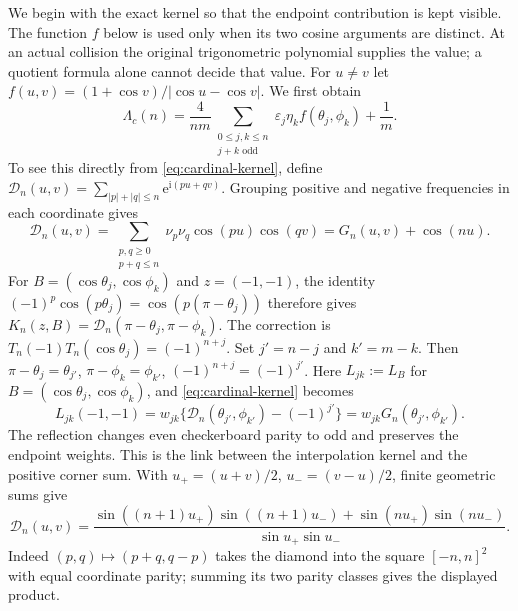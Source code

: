 We begin with the exact kernel so that the endpoint contribution is
kept visible. The function $f$ below is used only when its two cosine
arguments are distinct. At an actual collision the original
trigonometric polynomial supplies the value; a quotient formula alone
cannot decide that value.
For $u\ne v$ let $f(u,v)=(1+\cos v)/|\cos u-\cos v|$. We first obtain
\begin{equation}\label{cu:positive}
 \Lambda_c(n)=\frac4{nm}
 \sum_{\substack{0\leq j,k\leq n\\j+k\text{ odd}}}
       \varepsilon_j\eta_k f(\theta_j,\phi_k)+\frac1m.
\end{equation}
To see this directly from \eqref{eq:cardinal-kernel}, define
$\mathcal{D}_n(u,v)=\sum_{|p|+|q|\leq n}\mathrm e^{\mathrm i(pu+qv)}$. Grouping positive and negative frequencies in each coordinate gives
\[
 \mathcal D_n(u,v)=\sum_{\substack{p,q\geq0\\p+q\leq n}}
       \nu_p\nu_q\cos(pu)\cos(qv)=G_n(u,v)+\cos(nu).
\]
For $B=(\cos\theta_j,\cos\phi_k)$ and $z=(-1,-1)$,
the identity $(-1)^p\cos(p\theta_j)=\cos(p(\pi-\theta_j))$
therefore gives $K_n(z,B)=\mathcal D_n(\pi-\theta_j,\pi-\phi_k)$.
The correction is $T_n(-1)T_n(\cos\theta_j)=(-1)^{n+j}$.
Set $j'=n-j$ and $k'=m-k$. Then
$\pi-\theta_j=\theta_{j'}$, $\pi-\phi_k=\phi_{k'}$,
$(-1)^{n+j}=(-1)^{j'}$. Here $L_{jk}:=L_B$ for
$B=(\cos\theta_j,\cos\phi_k)$, and \eqref{eq:cardinal-kernel} becomes
\[
 L_{jk}(-1,-1)=w_{jk}
 \{\mathcal D_n(\theta_{j'},\phi_{k'})-(-1)^{j'}\}
 =w_{jk}G_n(\theta_{j'},\phi_{k'}).
\]
The reflection changes even checkerboard parity to odd and preserves
the endpoint weights. This is the link between the interpolation kernel
and the positive corner sum. With
$u_+=(u+v)/2$, $u_-=(v-u)/2$, finite geometric sums give
\[
 \mathcal{D}_n(u,v)=\frac{\sin((n+1)u_+)\sin((n+1)u_-)+\sin(nu_+)\sin(nu_-)}
                  {\sin u_+\sin u_-}.
\]
Indeed $(p,q)\mapsto(p+q,q-p)$ takes the diamond into the square
$[-n,n]^2$ with equal coordinate parity; summing its two parity classes
gives the displayed product.

